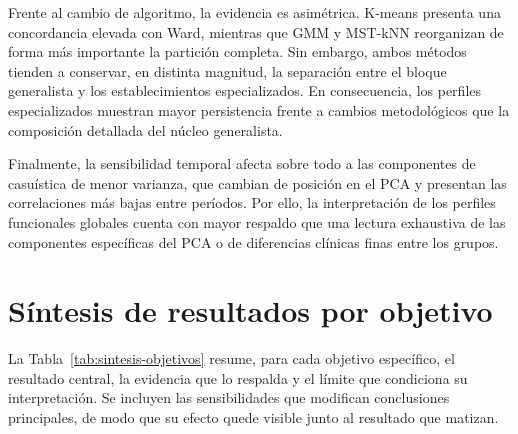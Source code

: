 Frente al cambio de algoritmo, la evidencia es asimétrica. K-means presenta una concordancia elevada con Ward, mientras que GMM y MST-kNN reorganizan de forma más importante la partición completa. Sin embargo, ambos métodos tienden a conservar, en distinta magnitud, la separación entre el bloque generalista y los establecimientos especializados. En consecuencia, los perfiles especializados muestran mayor persistencia frente a cambios metodológicos que la composición detallada del núcleo generalista.

Finalmente, la sensibilidad temporal afecta sobre todo a las componentes de casuística de menor varianza, que cambian de posición en el PCA y presentan las correlaciones más bajas entre períodos. Por ello, la interpretación de los perfiles funcionales globales cuenta con mayor respaldo que una lectura exhaustiva de las componentes específicas del PCA o de diferencias clínicas finas entre los grupos.

\section{Síntesis de resultados por objetivo}
\label{sec:sintesis-objetivos}

La Tabla~\ref{tab:sintesis-objetivos} resume, para cada objetivo específico, el
resultado central, la evidencia que lo respalda y el límite que condiciona su
interpretación. Se incluyen las sensibilidades que modifican conclusiones
principales, de modo que su efecto quede visible junto al resultado que matizan.

